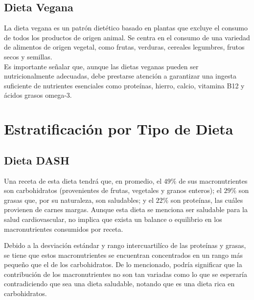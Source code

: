 \documentclass[12pt,a4paper]{article}
\begin{document}
{{        \subsection{Dieta Vegana}
        {
            \cite{marvastipopular} La dieta vegana es un patrón dietético basado en 
            plantas que excluye el consumo de todos los productos de origen animal. Se 
            centra en el consumo de una variedad de alimentos de origen vegetal, como 
            frutas, verduras, cereales legumbres, frutos secos y semillas.\\
            \vspace{\baselineskip}
            Es importante señalar que, aunque las dietas veganas pueden ser 
            nutricionalmente adecuadas, debe prestarse atención a garantizar una 
            ingesta suficiente de nutrientes esenciales como proteínas, hierro, 
            calcio, vitamina B12 y ácidos grasos omega-3.
        }
        }

        \newpage

        \section{Estratificación por Tipo de Dieta}\label{anexo:C}
        {
            \subsection{Dieta DASH}\label{anexo:C_dash}
            {
            Una receta de esta dieta tendrá que, en promedio, el $49\%$ de sus 
            macronutrientes son carbohidratos (provenientes de frutas, vegetales 
            y granos enteros); el $29\%$ son grasas que, por su naturaleza, son 
            saludables; y el $22\%$ son proteínas, las cuáles provienen de carnes margas.
            Aunque esta dieta se menciona ser saludable para la salud cardiovascular, 
            no implica que exista un balance o equilibrio en los macronutrientes 
            consumidos por receta.\newline
            
            Debido a la desviación estándar y rango intercuartilíco de las 
            proteínas y grasas, se tiene que estos macronutrientes se encuentran 
            concentrados en un rango más pequeño que el de los 
            carbohidratos. De lo mencionado, podría significar que la contribución 
            de los macronutrientes no son tan variadas como lo que se esperaría 
            contradiciendo que sea una dieta saludable, notando que es una dieta 
            rica en carbohidratos.

}}}
\end{document}
